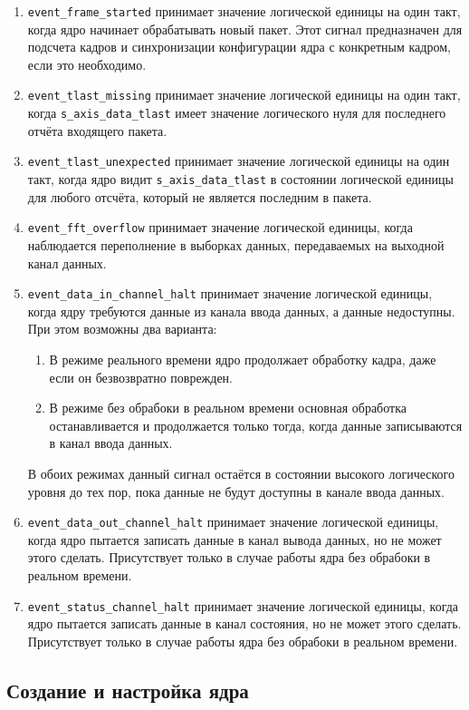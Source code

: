 \begin{enumerate}
	\item \verb|event_frame_started| принимает значение логической единицы на один такт, когда ядро начинает обрабатывать новый пакет. Этот сигнал предназначен для подсчета кадров и синхронизации конфигурации ядра с конкретным кадром, если это необходимо.
	\item \verb|event_tlast_missing| принимает значение логической единицы на один такт, когда \verb|s_axis_data_tlast| имеет значение логического нуля для последнего отчёта входящего пакета.
	\item \verb|event_tlast_unexpected| принимает значение логической единицы на один такт, когда ядро видит \verb|s_axis_data_tlast| в состоянии логической единицы для любого отсчёта, который не является последним в пакета. 
	\item \verb|event_fft_overflow| принимает значение логической единицы, когда наблюдается переполнение в выборках данных, передаваемых на выходной канал данных. 
	\item \verb|event_data_in_channel_halt| принимает значение логической единицы, когда ядру требуются данные из канала ввода данных, а данные недоступны. При этом возможны два варианта:
	\begin{enumerate}
		\item В режиме реального времени ядро продолжает обработку кадра, даже если он безвозвратно поврежден.
		\item В режиме без обрабоки в реальном времени основная обработка останавливается и продолжается только тогда, когда данные записываются в канал ввода данных.
	\end{enumerate}
	В обоих режимах данный сигнал остаётся в состоянии высокого логического уровня до тех пор, пока данные не будут доступны в канале ввода данных.
	\item \verb|event_data_out_channel_halt| принимает значение логической единицы, когда ядро пытается записать данные в канал вывода данных, но не может этого сделать. Присутствует только в случае работы ядра без обрабоки в реальном времени. 
	\item \verb|event_status_channel_halt| принимает значение логической единицы, когда ядро пытается записать данные в канал состояния, но не может этого сделать. Присутствует только в случае работы ядра без обрабоки в реальном времени. 
\end{enumerate}

\subsection{Создание и настройка ядра}

